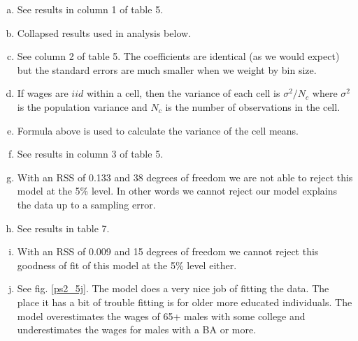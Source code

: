 \documentclass[11pt]{article}
\begin{document}
\begin{enumerate}[a)]

	\item See results in column 1 of table 5. 
		

	\item Collapsed results used in analysis below.

	\item See column 2 of table 5. The coefficients are identical (as we would expect) but the standard errors are much smaller when we weight by bin size. 

	\item If wages are $iid$ within a cell, then the variance of each cell is $\sigma^2 / N_c$ where $\sigma^2$ is the population variance and $N_c$ is the number of observations in the cell.
 
	\item Formula above is used to calculate the variance of the cell means.

	\item See results in column 3 of table 5. 

	\item With an RSS of 0.133 and 38 degrees of freedom we are not able to reject this model at the 5\% level. In other words we cannot reject our model explains the data up to a sampling error. 

	\item See results in table 7. 
		
	\item With an RSS of 0.009 and 15 degrees of freedom we cannot reject this goodness of fit of this model at the 5\% level either. 
	\item See fig. \ref{ps2_5j}. The model does a very nice job of fitting the data. The place it has a bit of trouble fitting is for older more educated individuals. The model overestimates the wages of 65+ males with some college and underestimates the wages for males with a BA or more. 


\end{enumerate}
\end{document}
